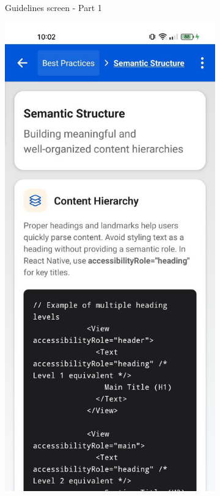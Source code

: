 \begin{enumerate}
\begin{itemize}
\begin{figure}[ht]
\begin{subfigure}[b]{0.43\textwidth}
                \caption{Guidelines screen - Part 1}
                \label{fig:guidelines-left}
            \end{subfigure}
            \hfill
            \begin{subfigure}[b]{0.43\textwidth}
                \centering
                \includegraphics[width=\linewidth, alt={Second part of the WCAG guidelines screen}]{img/guidelines2.jpg}

\end{subfigure}
\end{figure}
\end{itemize}
\end{enumerate}
